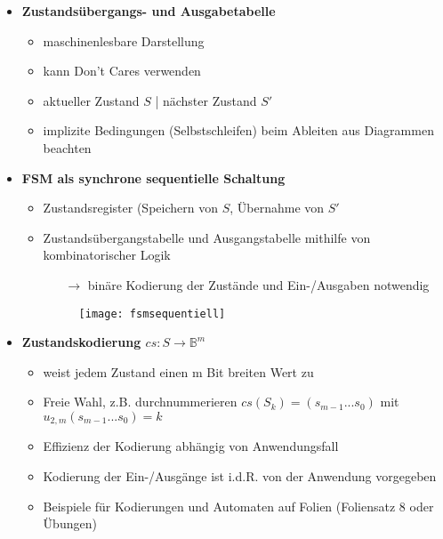 \begin{itemize}
\begin{itemize}
\begin{itemize}
	\end{itemize}
	
\item \textbf{Zustandsübergangs- und Ausgabetabelle}
	\begin{itemize}
	\item maschinenlesbare Darstellung
	\item kann Don't Cares verwenden
	\item aktueller Zustand $S$ | nächster Zustand $S'$
	\item implizite Bedingungen (Selbstschleifen) beim Ableiten aus Diagrammen beachten
	\end{itemize}
	
\item \textbf{FSM als synchrone sequentielle Schaltung}
	\begin{itemize}
	\item Zustandsregister (Speichern von $S$, Übernahme von $S'$
	\item Zustandsübergangstabelle und Ausgangstabelle mithilfe von kombinatorischer Logik
		\begin{itemize}
		\item[$\rightarrow$] binäre Kodierung der Zustände und Ein-/Ausgaben notwendig
		\end{itemize}
		
	\item[] \begin{figure}[H]
				\begin{center}
				\texttt{[image: fsmsequentiell]}
				\end{center}
			\end{figure}
	\end{itemize}
	
\item \textbf{Zustandskodierung $cs: S \rightarrow \mathbb{B}^m$}
	\begin{itemize}
	\item weist jedem Zustand einen m Bit breiten Wert zu
	\item Freie Wahl, z.B. durchnummerieren $cs(S_k)=(s_{m-1}...s_0)$ mit $u_{2,m}(s_{m-1}...s_0)=k$
	\item Effizienz der Kodierung abhängig von Anwendungsfall
	\item Kodierung der Ein-/Ausgänge ist i.d.R. von der Anwendung vorgegeben
	\item Beispiele für Kodierungen und Automaten auf Folien (Foliensatz 8 oder Übungen)
	\end{itemize}



\end{itemize}
\end{itemize}
